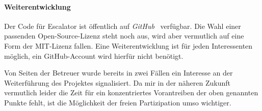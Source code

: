 \documentclass[11pt,utf8,notoc,bibnum,german,final]{zihpub}
\begin{document}
\paragraph{Weiterentwicklung}

Der Code für Escalator ist öffentlich auf \emph{GitHub}~\cite{escalator-github}
verfügbar. Die Wahl einer passenden Open-Source-Lizenz steht noch aus, wird
aber vermutlich auf eine Form der MIT-Lizenz fallen. Eine Weiterentwicklung ist
für jeden Interessenten möglich, ein GitHub-Account wird hierfür nicht benötigt.

Von Seiten der Betreuer wurde bereits in zwei Fällen ein Interesse an der
Weiterführung des Projektes signalisiert. Da mir in der näheren Zukunft
vermutlich leider die Zeit für ein konzentriertes Vorantreiben der oben
genannten Punkte fehlt, ist die Möglichkeit der freien Partizipation umso
wichtiger.
\end{document}
